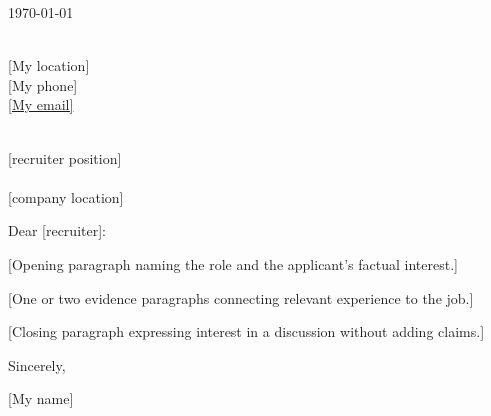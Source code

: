 \documentclass[11pt]{article}
\begin{document}
\begin{flushright}
\today
\end{flushright}

\noindent [My name]\\
[My location] \\
[My phone] \\
\href{mailto:[My email]}{[My email]} \\

\vspace{1em}

\noindent [company] \\
[recruiter position] \\
[recruiter (if none provided, put Hiring Manager)] \\
[company location] \\

\vspace{1em}

\noindent Dear [recruiter]:

\setlength{\parindent}{15pt}
\setlength{\parskip}{0.75em}

[Opening paragraph naming the role and the applicant's factual interest.]

[One or two evidence paragraphs connecting relevant experience to the job.]

[Closing paragraph expressing interest in a discussion without adding claims.]

\setlength{\parindent}{0pt}

\vspace{1em}
Sincerely,

\vspace{1em}
[My name]
\end{document}
